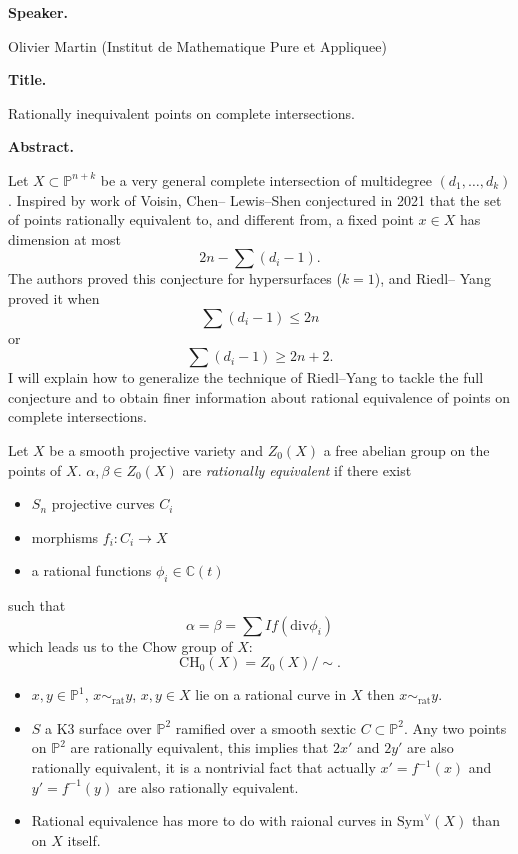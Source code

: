 \medskip\noindent
{\bf Speaker.}

Olivier Martin
(Institut de Mathematique Pure et
Appliquee)

\medskip\noindent
{\bf Title.}

Rationally inequivalent points on
complete intersections.

\medskip\noindent
{\bf Abstract.}

Let $X\subset \mathbb{P}^{n+k}$ be a
very general complete intersection of
multidegree $(d_1,\dots,d_k)$.
Inspired by work of Voisin, Chen--
Lewis--Shen conjectured in 2021 that
the set of points rationally
equivalent to, and different from, a
fixed point $x\in X$ has dimension at
most
$$
2n-\sum(d_i-1).
$$
The authors proved this conjecture for
hypersurfaces ($k=1$), and Riedl--
Yang proved it when
$$
\sum(d_i-1)\le 2n
$$
or
$$
\sum(d_i-1)\ge 2n+2.
$$
I will explain how to generalize the
technique of Riedl--Yang to tackle the
full conjecture and to obtain finer
information about rational
equivalence of points on complete
intersections.

Let $X$ be a smooth projective variety and
$Z_0(X)$ a free abelian group on the points
of $X$.
$\alpha,\beta \in Z_0(X)$ are {\it rationally
equivalent} if there exist
\begin{itemize}
\item $S_n$ projective curves $C_i$
\item morphisms $f_i:C_i \to X$
\item a rational functions $\phi_i \in
\mathbb{C}(t)$
\end{itemize}
such that
$$
\alpha = \beta= \sum I f(\text{div} \phi_i)
$$
which leads us to the Chow group of $X$:
$$
\text{CH}_0(X)
=Z_0(X)/\sim.
$$
\begin{example}
\label{example-rat-equiv}
\begin{itemize}
\item $x,y \in \mathbb{P}^1$,
$x\sim_{\text{rat}}y$,
$x, y \in X$ lie on a rational curve in $X$
then $x\sim_{\text{rat}}y$.
\item $S$ a K3 surface over $\mathbb{P}^2$
ramified over a smooth sextic $C \subset \mathbb{P}^2$.
Any two points on $\mathbb{P}^2$ are
rationally equivalent, this implies
that $2x'$ and $2y'$ are also 
rationally equivalent, it is a nontrivial
fact that actually $x'=f^{-1}(x)$ and $y'
=f^{-1}(y)$ are also rationally equivalent.
\item Rational equivalence has more to do
with
raional curves in $\text{Sym}^\vee (X)$
than on $X$ itself.
\end{itemize}
\end{example}

